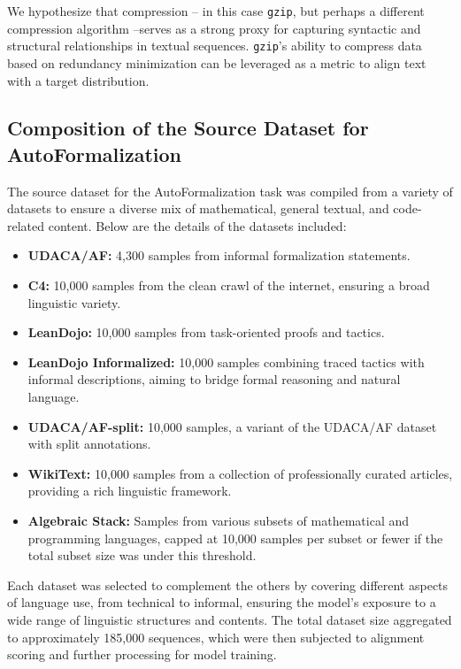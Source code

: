 We hypothesize that compression -- in this case \texttt{gzip}, but perhaps a different compression algorithm --serves as a strong proxy for capturing syntactic and structural relationships in textual sequences. 
\texttt{gzip}’s ability to compress data based on redundancy minimization can be leveraged as a metric to align text with a target distribution. 


\subsection{Composition of the Source Dataset for AutoFormalization}
\label{app:subsec:dataset_composition_af}
The source dataset for the AutoFormalization task was compiled from a variety of datasets to ensure a diverse mix of mathematical, general textual, and code-related content. Below are the details of the datasets included:

\begin{itemize}
    \item \textbf{UDACA/AF:} 4,300 samples from informal formalization statements.
    \item \textbf{C4:} 10,000 samples from the clean crawl of the internet, ensuring a broad linguistic variety.
    \item \textbf{LeanDojo:} 10,000 samples from task-oriented proofs and tactics.
    \item \textbf{LeanDojo Informalized:} 10,000 samples combining traced tactics with informal descriptions, aiming to bridge formal reasoning and natural language.
    \item \textbf{UDACA/AF-split:} 10,000 samples, a variant of the UDACA/AF dataset with split annotations.
    \item \textbf{WikiText:} 10,000 samples from a collection of professionally curated articles, providing a rich linguistic framework.
    \item \textbf{Algebraic Stack:} Samples from various subsets of mathematical and programming languages, capped at 10,000 samples per subset or fewer if the total subset size was under this threshold.
\end{itemize}

Each dataset was selected to complement the others by covering different aspects of language use, from technical to informal, ensuring the model's exposure to a wide range of linguistic structures and contents. The total dataset size aggregated to approximately 185,000 sequences, which were then subjected to alignment scoring and further processing for model training.


